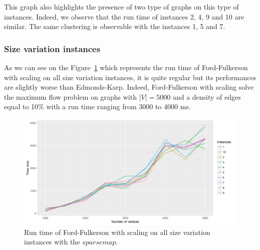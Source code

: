 This graph also highlights the presence of two type of graphs on this type of instances. Indeed, we observe that the run time of instances 2, 4, 9 and 10 are similar. The same clustering is observable with the instances 1, 5 and 7.
\subsubsection{Size variation instances}
As we can see on the Figure~\ref{fig:FFmeansize} which represents the run time of Ford-Fulkerson with scaling on all size variation instances, it is quite regular but its performances are slightly worse than Edmonds-Karp. Indeed, Ford-Fulkerson with scaling solve the maximum flow problem on graphs with $|V|=5000$ and a density of edges equal to 10\% with a run time ranging from 3000 to 4000 ms.
\begin{figure}[H]
\begin{center}
\includegraphics[scale=0.5]{images/results/FFmeansize2.png}
\caption{Run time of Ford-Fulkerson with scaling on all size variation instances with the $sparse map$.}
\label{fig:FFmeansize}
\end{center}
\end{figure}
